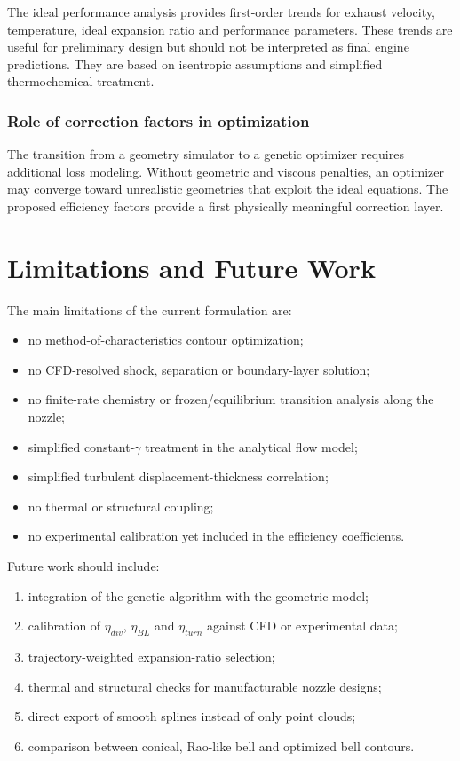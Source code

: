 \documentclass[11pt,a4paper]{article}
\begin{document}
The ideal performance analysis provides first-order trends for exhaust velocity, temperature, ideal expansion ratio and performance parameters. These trends are useful for preliminary design but should not be interpreted as final engine predictions. They are based on isentropic assumptions and simplified thermochemical treatment.

\subsubsection{Role of correction factors in optimization}

The transition from a geometry simulator to a genetic optimizer requires additional loss modeling. Without geometric and viscous penalties, an optimizer may converge toward unrealistic geometries that exploit the ideal equations. The proposed efficiency factors provide a first physically meaningful correction layer.

\section{Limitations and Future Work}

The main limitations of the current formulation are:
\begin{itemize}
    \item no method-of-characteristics contour optimization;
    \item no CFD-resolved shock, separation or boundary-layer solution;
    \item no finite-rate chemistry or frozen/equilibrium transition analysis along the nozzle;
    \item simplified constant-$\gamma$ treatment in the analytical flow model;
    \item simplified turbulent displacement-thickness correlation;
    \item no thermal or structural coupling;
    \item no experimental calibration yet included in the efficiency coefficients.
\end{itemize}

Future work should include:
\begin{enumerate}
    \item integration of the genetic algorithm with the geometric model;
    \item calibration of $\eta_{div}$, $\eta_{BL}$ and $\eta_{turn}$ against CFD or experimental data;
    \item trajectory-weighted expansion-ratio selection;
    \item thermal and structural checks for manufacturable nozzle designs;
    \item direct export of smooth splines instead of only point clouds;
    \item comparison between conical, Rao-like bell and optimized bell contours.
\end{enumerate}
\end{document}
